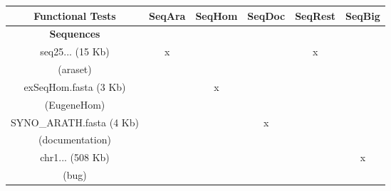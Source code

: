 \documentclass[a4paper,11pt]{article}
\begin{document}
\begin{center}
\begin{tabular}{|c|c|c|c|c|c|} \hline \hline
{\bf Functional Tests}& {\bf SeqAra}& {\bf SeqHom}& {\bf SeqDoc}& {\bf SeqRest}& {\bf SeqBig}\\ \hline \hline

{\bf Sequences}& & & & &\\ \hline \hline
seq25... (15 Kb)            & x &   &   & x &  \\
(araset)                 &   &   &   &   &  \\ \hline 
exSeqHom.fasta (3 Kb)    &   & x &   &   &  \\ 
(EugeneHom)              &   &   &   &   &  \\ \hline 
SYNO\_ARATH.fasta (4 Kb) &   &   & x &   &  \\ 
(documentation)          &   &   &   &   &  \\ \hline 
chr1... (508 Kb)            &   &   &   &   & x\\ 
(bug)                    &   &   &   &   &  \\ \hline \hline 


\end{tabular}
\end{center}
\end{document}
